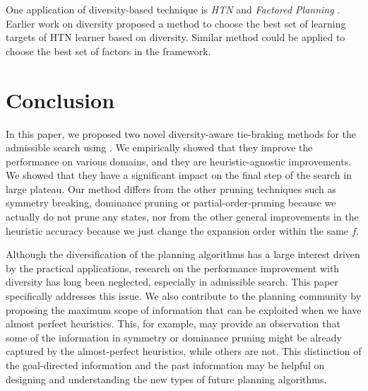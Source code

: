 One application of diversity-based technique is \emph{HTN} \cite{erol1994} and \emph{Factored Planning} \cite{amir2003factored,brafman2006factored,Asai2015}. Earlier work on diversity \cite{goldman2015measuring} proposed a method to choose the best set of learning targets of HTN learner based on diversity. Similar method could be applied to choose the best set of factors in the framework.


\section{Conclusion}

In this paper, we proposed two novel diversity-aware tie-braking methods for the admissible search using \astar. We empirically showed that they improve the performance on various domains, and they are heuristic-agnostic improvements. We showed that they have a significant impact on the final step of the search in large plateau.
Our method differs from the other pruning techniques such as symmetry breaking, dominance pruning or partial-order-pruning because we actually do not prune any states, nor from the other general improvements in the heuristic accuracy because we just change the expansion order within the same $f$.

Although the diversification of the planning algorithms has a large interest driven by the practical applications, research on the performance improvement with diversity has long been neglected, especially in admissible search. This paper specifically addresses this issue. We also  contribute to the planning community by proposing the maximum scope of information that can be exploited when we have almost perfect heuristics. This, for example, may provide an observation that some of the information in symmetry or dominance pruning might be already captured by the almost-perfect heuristics, while others are not. This distinction of the goal-directed information and the past information may be helpful on designing and understanding the new types of future planning algorithms.

